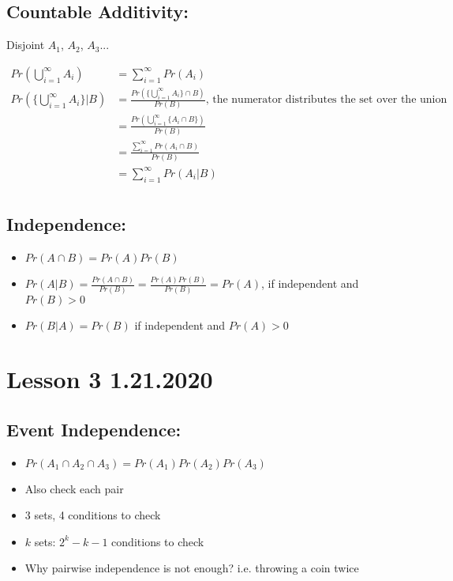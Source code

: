 \documentclass[11pt,letterpaper,titlepage]{article}
\begin{document}
\subsection{Countable Additivity:}

Disjoint $A_1$, $A_2$, $A_3$...

\begin{equation*}
    \begin{aligned}
        Pr(\bigcup\limits_{i=1}^{\infty} A_i) &= \sum_{i=1}^{\infty} Pr(A_i) \\
        Pr(\{\bigcup\limits_{i=1}^{\infty} A_i\}|B) &= \frac{Pr(\{\bigcup\limits_{i=1}^{\infty} A_i \}\cap B)}{Pr(B)} \text{, the numerator distributes the set over the union} \\
        &= \frac{Pr(\bigcup\limits_{i=1}^{\infty} \{A_i \cap B\})}{Pr(B)} \\
        &= \frac{\sum\limits_{i=1}^{\infty} Pr(A_i \cap B)}{Pr(B)} \\
        &= \sum\limits_{i=1}^{\infty} Pr(A_i | B) \\
    \end{aligned}
\end{equation*}

\subsection{Independence:}

\begin{itemize}
    \item $Pr(A \cap B) = Pr(A) Pr(B)$
    
    \item $Pr(A|B) = \frac{Pr(A \cap B)}{Pr(B)} = \frac{Pr(A)Pr(B)}{Pr(B)} = Pr(A)$, if independent and $Pr(B) > 0$
    
    \item $Pr(B|A) = Pr(B)$ if independent and $Pr(A) > 0$
\end{itemize}

\newpage

\section{Lesson 3 1.21.2020}

\subsection{Event Independence:}

\begin{itemize}
    \item $Pr(A_1 \cap A_2 \cap A_3) = Pr(A_1)Pr(A_2)Pr(A_3)$
    
    \item Also check each pair
    
    \item 3 sets, 4 conditions to check
    
    \item $k$ sets: $2^k - k -1$ conditions to check
    
    \item Why pairwise independence is not enough? i.e. throwing a coin twice
\end{itemize}
\end{document}
